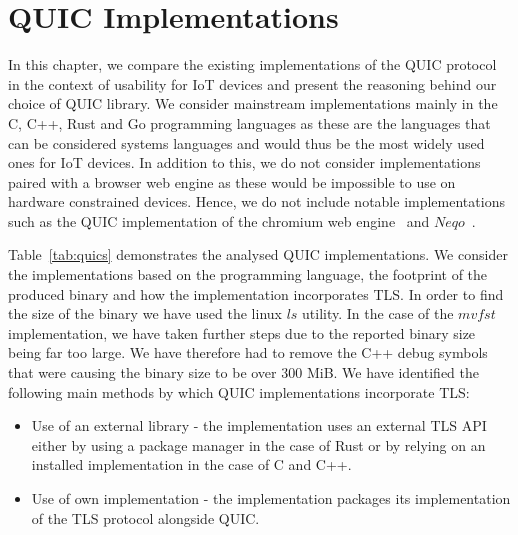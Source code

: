 \chapter{QUIC Implementations} \label{chap:quic_impl}

In this chapter, we compare the existing implementations of the QUIC protocol in the context of usability for IoT devices and present the reasoning behind our choice of QUIC library.
We consider mainstream implementations mainly in the C, C++, Rust and Go programming languages as these are the languages that can be considered systems languages and would thus be the most widely used ones for IoT devices.
In addition to this, we do not consider implementations paired with a browser web engine as these would be impossible to use on hardware constrained devices.
Hence, we do not include notable implementations such as the QUIC implementation of the chromium web engine~\citep{chromium_quic_2021} and $Neqo$~\citep{mozilla_neqo_2022}.

Table~\ref{tab:quics} demonstrates the analysed QUIC implementations.
We consider the implementations based on the programming language, the footprint of the produced binary and how the implementation incorporates TLS.
In order to find the size of the binary we have used the linux $ls$ utility.
In the case of the $mvfst$ implementation, we have taken further steps due to the reported binary size being far too large.
We have therefore had to remove the C++ debug symbols that were causing the binary size to be over 300 MiB.
We have identified the following main methods by which QUIC implementations incorporate TLS:

\begin{itemize}
    \item Use of an external library - the implementation uses an external TLS API either by using a package manager in the case of Rust or by relying on an installed implementation in the case of C and C++.
    \item Use of own implementation - the implementation packages its implementation of the TLS protocol alongside QUIC.
\end{itemize}

